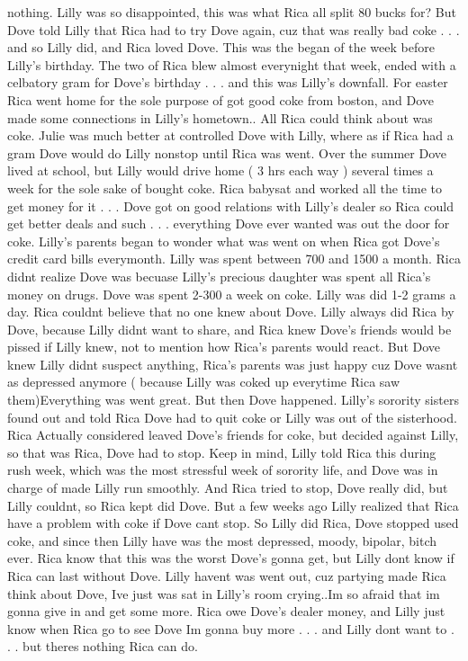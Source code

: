 \documentclass[12pt]{book}
\begin{document}
nothing. Lilly was so disappointed, this was what Rica all split 80 bucks for? But Dove told Lilly that Rica had to try Dove again, cuz that was really bad coke . . .  and so Lilly did, and Rica loved Dove. This was the began of the week before Lilly's birthday. The two of Rica blew almost everynight that week, ended with a celbatory gram for Dove's birthday . . .  and this was Lilly's downfall. For easter Rica went home for the sole purpose of got good coke from boston, and Dove made some connections in Lilly's hometown.. All Rica could think about was coke. Julie was much better at controlled Dove with Lilly, where as if Rica had a gram Dove would do Lilly nonstop until Rica was went. Over the summer Dove lived at school, but Lilly would drive home ( 3 hrs each way ) several times a week for the sole sake of bought coke. Rica babysat and worked all the time to get money for it . . .  Dove got on good relations with Lilly's dealer so Rica could get better deals and such . . .  everything Dove ever wanted was out the door for coke. Lilly's parents began to wonder what was went on when Rica got Dove's credit card bills everymonth. Lilly was spent between 700 and 1500 a month. Rica didnt realize Dove was becuase Lilly's precious daughter was spent all Rica's money on drugs. Dove was spent 2-300 a week on coke. Lilly was did 1-2 grams a day. Rica couldnt believe that no one knew about Dove. Lilly always did Rica by Dove, because Lilly didnt want to share, and Rica knew Dove's friends would be pissed if Lilly knew, not to mention how Rica's parents would react. But Dove knew Lilly didnt suspect anything, Rica's parents was just happy cuz Dove wasnt as depressed anymore ( because Lilly was coked up everytime Rica saw them)Everything was went great. But then Dove happened. Lilly's sorority sisters found out and told Rica Dove had to quit coke or Lilly was out of the sisterhood. Rica Actually considered leaved Dove's friends for coke, but decided against Lilly, so that was Rica, Dove had to stop. Keep in mind, Lilly told Rica this during rush week, which was the most stressful week of sorority life, and Dove was in charge of made Lilly run smoothly. And Rica tried to stop, Dove really did, but Lilly couldnt, so Rica kept did Dove. But a few weeks ago Lilly realized that Rica have a problem with coke if Dove cant stop. So Lilly did Rica, Dove stopped used coke, and since then Lilly have was the most depressed, moody, bipolar, bitch ever. Rica know that this was the worst Dove's gonna get, but Lilly dont know if Rica can last without Dove. Lilly havent was went out, cuz partying made Rica think about Dove, Ive just was sat in Lilly's room crying..Im so afraid that im gonna give in and get some more. Rica owe Dove's dealer money, and Lilly just know when Rica go to see Dove Im gonna buy more . . .  and Lilly dont want to . . .  but theres nothing Rica can do.
\end{document}
